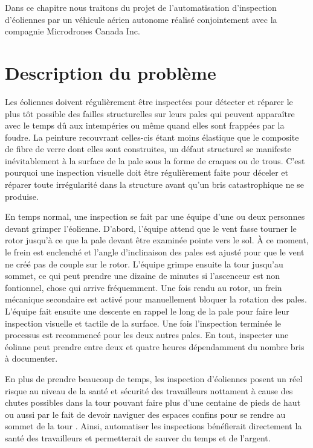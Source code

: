 \label{sec:uav}

Dans ce chapitre nous traitons du projet de l'automatisation d'inspection d'éoliennes par un véhicule aérien autonome réalisé conjointement avec la compagnie Microdrones Canada Inc.

\section{Description du problème}

Les éoliennes doivent régulièrement être inspectées pour détecter et réparer le plus tôt possible des failles structurelles sur leurs pales qui peuvent apparaître avec le temps dû aux intempéries ou même quand elles sont frappées par la foudre. La peinture recouvrant celles-cis étant moins élastique que le composite de fibre de verre dont elles sont construites, un défaut structurel se manifeste inévitablement à la surface de la pale sous la forme de craques ou de trous. C'est pourquoi une inspection visuelle doit être régulièrement faite pour déceler et réparer toute irrégularité dans la structure avant qu'un bris catastrophique ne se produise.

En temps normal, une inspection se fait par une équipe d'une ou deux personnes devant grimper l'éolienne. D'abord, l'équipe attend que le vent fasse tourner le rotor jusqu'à ce que la pale devant être examinée pointe vers le sol. À ce moment, le frein est enclenché et l'angle d'inclinaison des pales est ajusté pour que le vent ne créé pas de couple sur le rotor. L'équipe grimpe ensuite la tour jusqu'au sommet, ce qui peut prendre une dizaine de minutes si l'ascenceur est non fontionnel, chose qui arrive fréquemment. Une fois rendu au rotor, un frein mécanique secondaire est activé pour manuellement bloquer la rotation des pales. L'équipe fait ensuite une descente en rappel le long de la pale pour faire leur inspection visuelle et tactile de la surface. Une fois l'inspection terminée le processus est recommencé pour les deux autres pales. En tout, inspecter une éolinne peut prendre entre deux et quatre heures dépendamment du nombre bris à documenter.

En plus de prendre beaucoup de temps, les inspection d'éoliennes posent un réel risque au niveau de la santé et sécurité des travailleurs nottament à cause des chutes possibles dans la tour pouvant faire plus d'une centaine de pieds de haut ou aussi par le fait de devoir naviguer des espaces confins pour se rendre au sommet de la tour \citep{Osha2017}. Ainsi, automatiser les inspections bénéfierait directement la santé des travailleurs et permetterait de sauver du temps et de l'argent.

